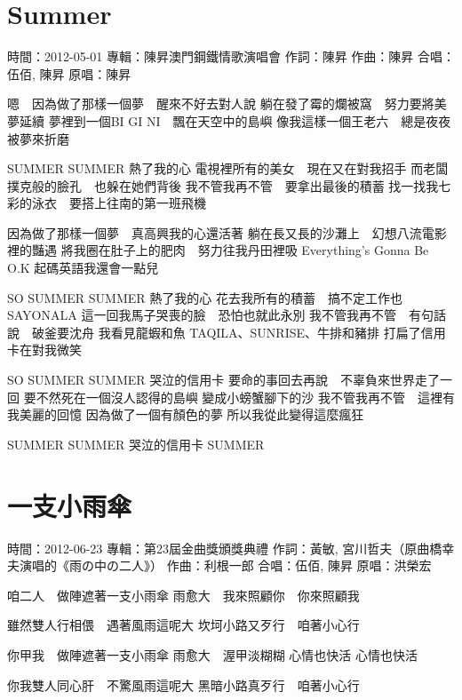 \documentclass[UTF8,a4paper,oneside,twocolumn,12pt]{ctexbook}
\newcommand{\infopair}[2]{\textbullet #1：#2}
\newcommand{\zc}[1][伍佰]{\infopair{作詞}{#1}}
\newcommand{\zq}[1][伍佰]{\infopair{作曲}{#1}}
\newcommand{\zj}[1]{\infopair{專輯}{#1}}
\newcommand{\yc}[1]{\infopair{原唱}{#1}}
\newcommand{\sj}[1]{\infopair{時間}{#1}}
\newenvironment{info}{\begin{flushleft}\kaishu
	}
	{\end{flushleft}\normalsize\yahei\par}
\newenvironment{lyric}{
	}
{}
\begin{document}
\section{Summer}%
\begin{info}
	\sj{2012-05-01}
	\zj{陳昇澳門鋼鐵情歌演唱會}
	\zc[陳昇]
	\zq[陳昇]
	\infopair{合唱}{伍佰, 陳昇}
	\yc{陳昇}
\end{info}
\begin{lyric}
	嗯　因為做了那樣一個夢　醒來不好去對人說
	躺在發了霉的爛被窩　努力要將美夢延續
	夢裡到一個BI GI NI　飄在天空中的島嶼
	像我這樣一個王老六　總是夜夜被夢來折磨

	SUMMER SUMMER 熱了我的心
	電視裡所有的美女　現在又在對我招手
	而老闆撲克般的臉孔　也躲在她們背後
	我不管我再不管　要拿出最後的積蓄
	找一找我七彩的泳衣　要搭上往南的第一班飛機

	因為做了那樣一個夢　真高興我的心還活著
	躺在長又長的沙灘上　幻想八流電影裡的豔遇
	將我圈在肚子上的肥肉　努力往我丹田裡吸
	Everything's Gonna Be O.K
	起碼英語我還會一點兒

	SO SUMMER SUMMER 熱了我的心
	花去我所有的積蓄　搞不定工作也 SAYONALA
	這一回我馬子哭喪的臉　恐怕也就此永別
	我不管我再不管　有句話說　破釜要沈舟
	我看見龍蝦和魚 TAQILA、SUNRISE、牛排和豬排
	打扁了信用卡在對我微笑

	SO SUMMER SUMMER 哭泣的信用卡
	要命的事回去再說　不辜負來世界走了一回
	要不然死在一個沒人認得的島嶼
	變成小螃蟹腳下的沙
	我不管我再不管　這裡有我美麗的回憶
	因為做了一個有顏色的夢
	所以我從此變得這麼瘋狂

	SUMMER
	SUMMER 哭泣的信用卡
	SUMMER
\end{lyric}

\section{一支小雨傘}%
\begin{info}
	\sj{2012-06-23}
	\zj{第23屆金曲獎頒獎典禮}
	\zc[黃敏, 宮川哲夫（原曲橋幸夫演唱的《雨の中の二人》）]
	\zq[利根一郎]
	\infopair{合唱}{伍佰, 陳昇}
	\yc{洪榮宏}
\end{info}
\begin{lyric}%
	咱二人　做陣遮著一支小雨傘
	雨愈大　我來照顧你　你來照顧我

	雖然雙人行相偎　遇著風雨這呢大
	坎坷小路又歹行　咱著小心行

	你甲我　做陣遮著一支小雨傘
	雨愈大　渥甲淡糊糊 心情也快活
	心情也快活

	你我雙人同心肝　不驚風雨這呢大
	黑暗小路真歹行　咱著小心行
\end{lyric}
\end{document}
